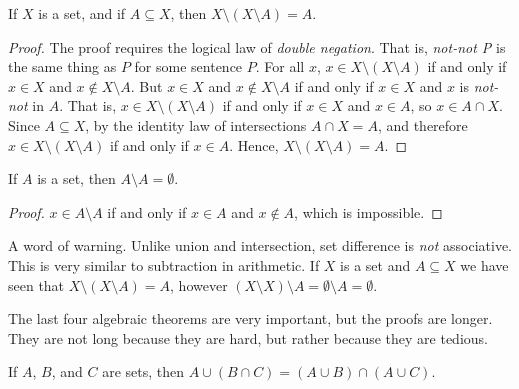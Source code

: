             \begin{theorem}
                If $X$ is a set, and if $A\subseteq{X}$, then
                $X\setminus(X\setminus{A})=A$.
            \end{theorem}
            \begin{proof}
                The proof requires the logical law of
                \textit{double negation}. That is, \textit{not-not P} is
                the same thing as $P$ for some sentence $P$. For all $x$,
                $x\in{X}\setminus(X\setminus{A})$ if and only if
                $x\in{X}$ and $x\notin{X}\setminus{A}$. But
                $x\in{X}$ and $x\notin{X}\setminus{A}$ if and only if
                $x\in{X}$ and $x$ is \textit{not-not} in $A$. That is,
                $x\in{X}\setminus(X\setminus{A})$ if and only if
                $x\in{X}$ and $x\in{A}$, so $x\in{A}\cap{X}$. Since
                $A\subseteq{X}$, by the identity law of intersections
                $A\cap{X}=A$, and therefore
                $x\in{X}\setminus(X\setminus{A})$ if and only if $x\in{A}$.
                Hence, $X\setminus(X\setminus{A})=A$.
            \end{proof}
            \begin{theorem}
                If $A$ is a set, then $A\setminus{A}=\emptyset$.
            \end{theorem}
            \begin{proof}
                $x\in{A}\setminus{A}$ if and only if $x\in{A}$ and
                $x\notin{A}$, which is impossible.
            \end{proof}
            A word of warning. Unlike union and intersection, set difference
            is \textit{not} associative. This is very similar to subtraction
            in arithmetic. If $X$ is a set and $A\subseteq{X}$ we have seen
            that $X\setminus(X\setminus{A})=A$, however
            $(X\setminus{X})\setminus{A}=\emptyset\setminus{A}=\emptyset$.
            \par\hfill\par
            The last four algebraic theorems are very important, but the proofs
            are longer. They are not long because they are hard, but rather
            because they are tedious.
            \begin{theorem}
                If $A$, $B$, and $C$ are sets, then
                $A\cup(B\cap{C})=(A\cup{B})\cap(A\cup{C})$.%
            \end{theorem}
